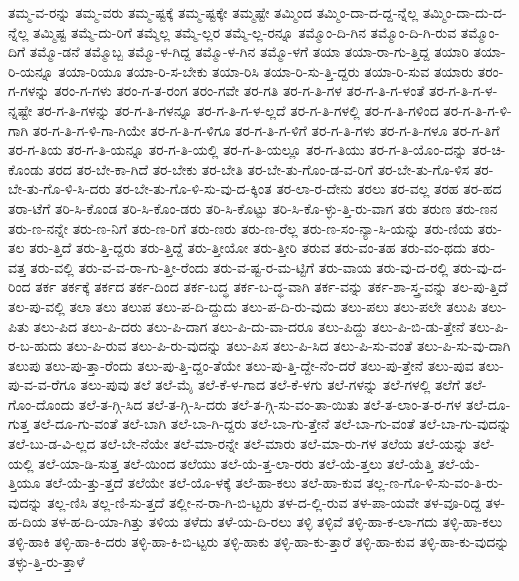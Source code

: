 {ತಮ್ಮ-ವ-ರನ್ನು
ತಮ್ಮ-ವರು
ತಮ್ಮ-ಷ್ಟಕ್ಕೆ
ತಮ್ಮ-ಷ್ಟಕ್ಕೇ
ತಮ್ಮಷ್ಟೇ
ತಮ್ಮಿಂದ
ತಮ್ಮಿಂ-ದಾ-ದ-ದ್ದ-ನ್ನೆಲ್ಲ
ತಮ್ಮಿಂ-ದಾ-ದು-ದ-ನ್ನೆಲ್ಲ
ತಮ್ಮಿಷ್ಟ
ತಮ್ಮೆ-ದು-ರಿಗೆ
ತಮ್ಮೆಲ್ಲ
ತಮ್ಮೆ-ಲ್ಲರ
ತಮ್ಮೆ-ಲ್ಲ-ರನ್ನೂ
ತಮ್ಮೊಂ-ದಿ-ಗಿನ
ತಮ್ಮೊಂ-ದಿ-ಗಿ-ರುವ
ತಮ್ಮೊಂ-ದಿಗೆ
ತಮ್ಮೊ-ಡನೆ
ತಮ್ಮೊಬ್ಬ
ತಮ್ಮೊ-ಳ-ಗಿದ್ದ
ತಮ್ಮೊ-ಳ-ಗಿನ
ತಮ್ಮೊ-ಳಗೆ
ತಯಾ
ತಯಾ-ರಾ-ಗು-ತ್ತಿದ್ದ
ತಯಾರಿ
ತಯಾ-ರಿ-ಯನ್ನೂ
ತಯಾ-ರಿಯೂ
ತಯಾ-ರಿ-ಸ-ಬೇಕು
ತಯಾ-ರಿಸಿ
ತಯಾ-ರಿ-ಸು-ತ್ತಿ-ದ್ದರು
ತಯಾ-ರಿ-ಸುವ
ತಯಾರು
ತರಂ-ಗ-ಗಳನ್ನು
ತರಂ-ಗ-ಗಳು
ತರಂ-ಗ-ತ-ರಂಗ
ತರಂ-ಗವೇ
ತರ-ಗತಿ
ತರ-ಗ-ತಿ-ಗಳ
ತರ-ಗ-ತಿ-ಗ-ಳಂತೆ
ತರ-ಗ-ತಿ-ಗ-ಳ-ನ್ನಷ್ಟೇ
ತರ-ಗ-ತಿ-ಗಳನ್ನು
ತರ-ಗ-ತಿ-ಗಳನ್ನೂ
ತರ-ಗ-ತಿ-ಗ-ಳ-ಲ್ಲದೆ
ತರ-ಗ-ತಿ-ಗಳಲ್ಲಿ
ತರ-ಗ-ತಿ-ಗಳಿಂದ
ತರ-ಗ-ತಿ-ಗ-ಳಿ-ಗಾಗಿ
ತರ-ಗ-ತಿ-ಗ-ಳಿ-ಗಾ-ಗಿಯೇ
ತರ-ಗ-ತಿ-ಗ-ಳಿಗೂ
ತರ-ಗ-ತಿ-ಗ-ಳಿಗೆ
ತರ-ಗ-ತಿ-ಗಳು
ತರ-ಗ-ತಿ-ಗಳೂ
ತರ-ಗ-ತಿಗೆ
ತರ-ಗ-ತಿಯ
ತರ-ಗ-ತಿ-ಯನ್ನೂ
ತರ-ಗ-ತಿ-ಯಲ್ಲಿ
ತರ-ಗ-ತಿ-ಯಲ್ಲೂ
ತರ-ಗ-ತಿಯು
ತರ-ಗ-ತಿ-ಯೊಂ-ದನ್ನು
ತರ-ಚಿ-ಕೊಂಡು
ತರದ
ತರ-ಬೇ-ಕಾ-ಗಿದೆ
ತರ-ಬೇಕು
ತರ-ಬೇತಿ
ತರ-ಬೇ-ತು-ಗೊಂ-ಡ-ವ-ರಿಗೆ
ತರ-ಬೇ-ತು-ಗೊ-ಳಿಸ
ತರ-ಬೇ-ತು-ಗೊ-ಳಿ-ಸಿ-ದರು
ತರ-ಬೇ-ತು-ಗೊ-ಳಿ-ಸು-ವು-ದ-ಕ್ಕಿಂತ
ತರ-ಲಾ-ರ-ದೇನು
ತರಲು
ತರ-ವಲ್ಲ
ತರಹ
ತರ-ಹದ
ತರಾ-ಟೆಗೆ
ತರಿ-ಸಿ-ಕೊಂಡ
ತರಿ-ಸಿ-ಕೊಂ-ಡರು
ತರಿ-ಸಿ-ಕೊಟ್ಟು
ತರಿ-ಸಿ-ಕೊ-ಳ್ಳು-ತ್ತಿ-ರು-ವಾಗ
ತರು
ತರುಣ
ತರು-ಣನ
ತರು-ಣ-ನನ್ನೇ
ತರು-ಣ-ನಿಗೆ
ತರು-ಣ-ರಿಗೆ
ತರು-ಣರು
ತರು-ಣ-ರೆಲ್ಲ
ತರು-ಣ-ಸಂ-ನ್ಯಾ-ಸಿ-ಯನ್ನು
ತರು-ಣಿಯ
ತರು-ತಲ
ತರು-ತ್ತಿದೆ
ತರು-ತ್ತಿ-ದ್ದರು
ತರು-ತ್ತಿದ್ದೆ
ತರು-ತ್ತೀಯೋ
ತರು-ತ್ತೀರಿ
ತರುವ
ತರು-ವಂ-ತಹ
ತರು-ವಂ-ಥದು
ತರು-ವತ್ತ
ತರು-ವಲ್ಲಿ
ತರು-ವ-ವ-ರಾ-ಗು-ತ್ತೀ-ರೆಂದು
ತರು-ವ-ಷ್ಟ-ರ-ಮ-ಟ್ಟಿಗೆ
ತರು-ವಾಯ
ತರು-ವು-ದ-ರಲ್ಲಿ
ತರು-ವು-ದ-ರಿಂದ
ತರ್ಕ
ತರ್ಕಕ್ಕೆ
ತರ್ಕದ
ತರ್ಕ-ದಿಂದ
ತರ್ಕ-ಬದ್ಧ
ತರ್ಕ-ಬ-ದ್ಧ-ವಾಗಿ
ತರ್ಕ-ವನ್ನು
ತರ್ಕ-ಶಾ-ಸ್ತ್ರ-ವನ್ನು
ತಲ-ಪು-ತ್ತಿದೆ
ತಲ-ಪು-ವಲ್ಲಿ
ತಲಾ
ತಲು
ತಲುಪ
ತಲು-ಪ-ದಿ-ದ್ದುದು
ತಲು-ಪ-ದಿ-ರು-ವುದು
ತಲು-ಪಲು
ತಲು-ಪಲೇ
ತಲುಪಿ
ತಲು-ಪಿತು
ತಲು-ಪಿದ
ತಲು-ಪಿ-ದರು
ತಲು-ಪಿ-ದಾಗ
ತಲು-ಪಿ-ದು-ವಾ-ದರೂ
ತಲು-ಪಿದ್ದು
ತಲು-ಪಿ-ಬಿ-ಡು-ತ್ತೇನೆ
ತಲು-ಪಿ-ರ-ಬ-ಹುದು
ತಲು-ಪಿ-ರುವ
ತಲು-ಪಿ-ರು-ವುದನ್ನು
ತಲು-ಪಿಸ
ತಲು-ಪಿ-ಸಿದ
ತಲು-ಪಿ-ಸು-ವಂತೆ
ತಲು-ಪಿ-ಸು-ವು-ದಾಗಿ
ತಲುಪು
ತಲು-ಪು-ತ್ತಾ-ರೆಂದು
ತಲು-ಪು-ತ್ತಿ-ದ್ದಂ-ತೆಯೇ
ತಲು-ಪು-ತ್ತಿ-ದ್ದೇ-ನೆಂ-ದರೆ
ತಲು-ಪು-ತ್ತೇನೆ
ತಲು-ಪುವ
ತಲು-ಪು-ವ-ವ-ರೆಗೂ
ತಲು-ಪುವು
ತಲೆ
ತಲೆ-ಮೈ
ತಲೆ-ಕೆ-ಳ-ಗಾದ
ತಲೆ-ಕೆ-ಳಗು
ತಲೆ-ಗಳನ್ನು
ತಲೆ-ಗಳಲ್ಲಿ
ತಲೆಗೆ
ತಲೆ-ಗೊಂ-ದೊಂದು
ತಲೆ-ತ-ಗ್ಗಿ-ಸಿದ
ತಲೆ-ತ-ಗ್ಗಿ-ಸಿ-ದರು
ತಲೆ-ತ-ಗ್ಗಿ-ಸು-ವಂ-ತಾ-ಯಿತು
ತಲೆ-ತ-ಲಾಂ-ತ-ರ-ಗಳ
ತಲೆ-ದೂ-ಗುತ್ತ
ತಲೆ-ದೂ-ಗು-ವಂತೆ
ತಲೆ-ಬಾಗಿ
ತಲೆ-ಬಾ-ಗಿ-ದ್ದರು
ತಲೆ-ಬಾ-ಗು-ತ್ತೇನೆ
ತಲೆ-ಬಾ-ಗು-ವಂತೆ
ತಲೆ-ಬಾ-ಗು-ವುದನ್ನು
ತಲೆ-ಬು-ಡ-ವಿ-ಲ್ಲದ
ತಲೆ-ಬೇ-ನೆಯೇ
ತಲೆ-ಮಾ-ರನ್ನೇ
ತಲೆ-ಮಾರು
ತಲೆ-ಮಾ-ರು-ಗಳ
ತಲೆಯ
ತಲೆ-ಯನ್ನು
ತಲೆ-ಯಲ್ಲಿ
ತಲೆ-ಯಾ-ಡಿ-ಸುತ್ತ
ತಲೆ-ಯಿಂದ
ತಲೆಯು
ತಲೆ-ಯೆ-ತ್ತ-ಲಾ-ರರು
ತಲೆ-ಯೆ-ತ್ತಲು
ತಲೆ-ಯೆತ್ತಿ
ತಲೆ-ಯೆ-ತ್ತಿಯೂ
ತಲೆ-ಯೆ-ತ್ತು-ತ್ತದೆ
ತಲೆಯೇ
ತಲೆ-ಯೊ-ಳಕ್ಕೆ
ತಲೆ-ಹಾ-ಕಲು
ತಲೆ-ಹಾ-ಕುವ
ತಲ್ಲ-ಣ-ಗೊ-ಳಿ-ಸು-ವಂ-ತಿ-ರು-ವುದನ್ನು
ತಲ್ಲ-ಣಿಸಿ
ತಲ್ಲ-ಣಿ-ಸು-ತ್ತದೆ
ತಲ್ಲೀ-ನ-ರಾ-ಗಿ-ಬಿ-ಟ್ಟರು
ತಳ-ದ-ಲ್ಲಿ-ರುವ
ತಳ-ಪಾ-ಯವೇ
ತಳ-ವೂ-ರಿದ್ದ
ತಳ-ಹ-ದಿಯ
ತಳ-ಹ-ದಿ-ಯಾ-ಗಿತ್ತು
ತಳಿಯ
ತಳೆದು
ತಳೆ-ಯ-ದಿ-ರಲು
ತಳ್ಳಿ
ತಳ್ಳಿವೆ
ತಳ್ಳಿ-ಹಾ-ಕ-ಲಾ-ಗದು
ತಳ್ಳಿ-ಹಾ-ಕಲು
ತಳ್ಳಿ-ಹಾಕಿ
ತಳ್ಳಿ-ಹಾ-ಕಿ-ದರು
ತಳ್ಳಿ-ಹಾ-ಕಿ-ಬಿ-ಟ್ಟರು
ತಳ್ಳಿ-ಹಾಕು
ತಳ್ಳಿ-ಹಾ-ಕು-ತ್ತಾರೆ
ತಳ್ಳಿ-ಹಾ-ಕುವ
ತಳ್ಳಿ-ಹಾ-ಕು-ವುದನ್ನು
ತಳ್ಳು-ತ್ತಿ-ರು-ತ್ತಾಳೆ
}
